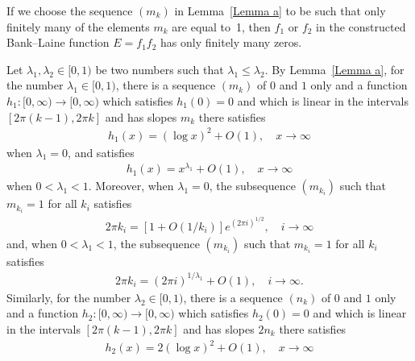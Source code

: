 \documentclass[12pt]{amsart}
\numberwithin{equation}{section}
\begin{document}
If we choose the sequence $(m_k)$ in Lemma~\ref{Lemma a} to be such that only finitely many of the elements $m_k$ are equal to~1, then $f_1$ or $f_2$ in the constructed Bank--Laine function $E=f_1f_2$ has only finitely many zeros.

Let $\lambda_1,\lambda_2\in[0,1)$ be two numbers such that $\lambda_1\leq \lambda_2$. By Lemma~\ref{Lemma a}, for the number $\lambda_1\in[0,1)$, there is a sequence $(m_k)$ of $0$ and $1$ only and a function $h_1:[0,\infty)\to[0,\infty)$ which satisfies $h_1(0)=0$ and which is linear in the intervals $[2\pi (k-1), 2\pi k]$ and has slopes $m_k$ there satisfies
\begin{equation*}%
\begin{split}
h_1(x)=(\log x)^2+O(1),  \quad x\to\infty
\end{split}
\end{equation*}
when $\lambda_1=0$, and satisfies
\begin{equation*}%
\begin{split}
h_1(x)=x^{\lambda_1}+O(1), \quad x\to\infty
\end{split}
\end{equation*}
when $0<\lambda_1<1$. Moreover, when $\lambda_1=0$, the subsequence $(m_{k_i})$ such that $m_{k_i}=1$ for all $k_i$ satisfies
\begin{equation*}%
\begin{split}
2\pi k_{i}=\left[1+O\left(1/k_i\right)\right]e^{(2\pi i)^{1/2}}, \quad i\to\infty
\end{split}
\end{equation*}
and, when $0<\lambda_1<1$, the subsequence $(m_{k_i})$ such that $m_{k_i}=1$ for all $k_i$ satisfies
\begin{equation*}%
\begin{split}
2\pi k_{i}=(2\pi i)^{1/\lambda_1}+O(1), \quad i\to\infty.
\end{split}
\end{equation*}
Similarly, for the number $\lambda_2\in[0,1)$, there is a sequence $(n_k)$ of $0$ and $1$ only and a function $h_2:[0,\infty)\to[0,\infty)$ which satisfies $h_2(0)=0$ and which is linear in the intervals $[2\pi (k-1), 2\pi k]$ and has slopes $2n_k$ there satisfies
\begin{equation*}%
\begin{split}
h_2(x)=2(\log x)^2+O(1),  \quad x\to\infty
\end{split}
\end{equation*}
\end{document}
